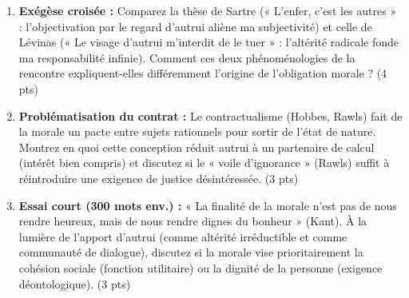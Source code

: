 \documentclass[11pt]{article}
\begin{document}
\begin{exercice}
    \begin{enumerate}
        \item \textbf{Exégèse croisée :} Comparez la thèse de Sartre (« L'enfer, c'est les autres » : l'objectivation par le regard d'autrui aliène ma subjectivité) et celle de Lévinas (« Le visage d'autrui m'interdit de le tuer » : l'altérité radicale fonde ma responsabilité infinie). Comment ces deux phénoménologies de la rencontre expliquent-elles différemment l'origine de l'obligation morale ? (4 pts)
        \item \textbf{Problématisation du contrat :} Le contractualisme (Hobbes, Rawls) fait de la morale un pacte entre sujets rationnels pour sortir de l'état de nature. Montrez en quoi cette conception réduit autrui à un partenaire de calcul (intérêt bien compris) et discutez si le « voile d'ignorance » (Rawls) suffit à réintroduire une exigence de justice désintéressée. (3 pts)
        \item \textbf{Essai court (300 mots env.) :} « La finalité de la morale n'est pas de nous rendre heureux, mais de nous rendre dignes du bonheur » (Kant). À la lumière de l'apport d'autrui (comme altérité irréductible et comme communauté de dialogue), discutez si la morale vise prioritairement la cohésion sociale (fonction utilitaire) ou la dignité de la personne (exigence déontologique). (3 pts)
    \end{enumerate}
\end{exercice}
\end{document}
